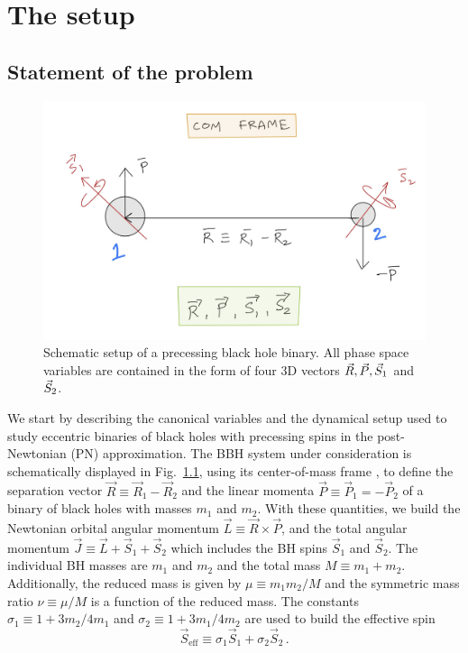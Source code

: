 \chapter{The setup}

\section{Statement of the problem}     \label{statement}



\begin{figure}
 \centering
  \includegraphics[width=0.9\linewidth]{setup_fig}
  \caption{Schematic setup of a precessing black hole
    binary. All phase space variables are contained in the
    form of four 3D vectors $\vec{R}, \vec{P}, \vec{S}_1$ and $\vec{S}_2$.
    \vspace{-1.em}
  }
  \label{fig:SetupFig}
\end{figure}


We start by describing the canonical variables and the dynamical
setup used to study eccentric binaries of black holes with precessing
spins in the post-Newtonian (PN) approximation. 
The BBH system under consideration is
schematically displayed in Fig.~\ref{fig:SetupFig}, using its
center-of-mass frame \cite{Damour:1988mr}, to define the separation
vector $\vec{R} \equiv \vec{R}_1 -\vec {R}_2$ and the linear momenta
$\vec{P} \equiv \vec{P}_1 = - \vec{P}_2$ of a binary of black holes
with masses $m_1$ and $m_2$. With these quantities, we build the
Newtonian orbital angular momentum $ \vec{L} \equiv \vec{R} \times \vec{P }$,
and the total angular momentum
$\vec{J} \equiv \vec{L} + \vec{S}_{1}+ \vec{S}_{2}$ which includes the BH
spins $\vec{S}_{1}$ and $ \vec{S}_{2}$. The individual BH masses are
$m_1$ and $m_2$ and the total mass $M \equiv m_1+m_2 $.
Additionally, the reduced mass is given by $\mu\equiv m_1m_2/M$ and the symmetric
mass ratio $\nu\equiv\mu/M$ is a function of the reduced mass.
The constants $\sigma_1 \equiv 1 + 3 m_{2}/4 m_{1}$ and
$\sigma_2 \equiv 1 + 3 m_{1}/4 m_{2}$ are used to build the effective
spin
\begin{equation}
  \vec{S}_{\mathrm{eff}} \equiv  \sigma_1 \vec{S}_{1} + \sigma_2\vec{S}_2 \,.
  \label{eq:seff}
\end{equation}

